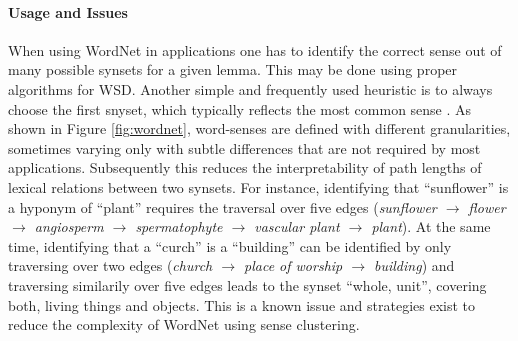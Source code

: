 \paragraph*{Usage and Issues}
When using WordNet in applications one has to identify the correct sense out of many possible synsets for a given lemma. This may be done using proper algorithms for \ac{WSD}. Another simple and frequently used heuristic is to always choose the first snyset, which typically reflects the most common sense \citep{mccarthy2004using}. As shown in Figure \ref{fig:wordnet}, word-senses are defined with different granularities, sometimes varying only with subtle differences that are not required by most applications. Subsequently this reduces the interpretability of path lengths of lexical relations between two synsets. For instance, identifying that ``sunflower'' is a hyponym of ``plant'' requires the traversal over five edges (\textit{sunflower $\rightarrow$ flower $\rightarrow$ angiosperm $\rightarrow$ spermatophyte $\rightarrow$ vascular plant $\rightarrow$ plant}). At the same time, identifying that a ``curch'' is a ``building'' can be identified by only traversing over two edges (\textit{church $\rightarrow$ place of worship $\rightarrow$ building}) and traversing similarily over five edges leads to the synset ``whole, unit'', covering both, living things and objects. This is a known issue \citep{resnik1995using} and  strategies exist to reduce the complexity of WordNet using sense clustering\citep{prakash2007learning}.

